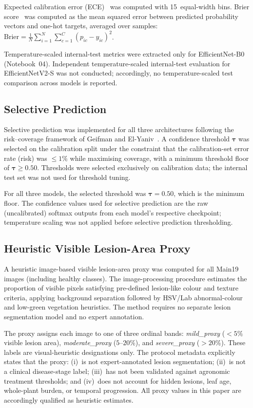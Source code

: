 \documentclass[conference]{IEEEtran}
\begin{document}
Expected calibration error (ECE)~\cite{naeini2015obtaining} was
computed with 15~equal-width bins. Brier score~\cite{brier1950verification}
was computed as the mean squared error between predicted probability
vectors and one-hot targets, averaged over samples:
$\text{Brier} = \frac{1}{N}\sum_{i=1}^{N}\sum_{c=1}^{C}(p_{ic} - y_{ic})^2$.

Temperature-scaled internal-test metrics were extracted only for
EfficientNet-B0 (Notebook~04). Independent temperature-scaled
internal-test evaluation for EfficientNetV2-S was not conducted;
accordingly, no temperature-scaled test comparison across models is
reported.

\subsection{Selective Prediction}

Selective prediction was implemented for all three architectures
following the risk--coverage framework of Geifman and
El-Yaniv~\cite{geifman2017selective}. A confidence threshold
$\bm{\tau}$ was selected on the calibration split under the constraint
that the calibration-set error rate (risk) was $\leq 1\%$ while
maximising coverage, with a minimum threshold floor of $\bm{\tau}
\geq 0.50$. Thresholds were selected exclusively on calibration data;
the internal test set was not used for threshold tuning.

For all three models, the selected threshold was
$\bm{\tau}\!=\!0.50$, which is the minimum floor. The confidence
values used for selective prediction are the raw (uncalibrated)
softmax outputs from each model's respective checkpoint; temperature
scaling was not applied before selective prediction thresholding.

\subsection{Heuristic Visible Lesion-Area Proxy}

A heuristic image-based visible lesion-area proxy was computed for all
Main19 images (including healthy classes). The image-processing
procedure estimates the proportion of visible pixels satisfying
pre-defined lesion-like colour and texture criteria, applying
background separation followed by HSV/Lab abnormal-colour and
low-green vegetation heuristics. The method requires no separate
lesion segmentation model and no expert annotation.

The proxy assigns each image to one of three ordinal bands:
\textit{mild\_proxy} ($<5\%$ visible lesion area),
\textit{moderate\_proxy} ($5$--$20\%$), and \textit{severe\_proxy}
($>20\%$). These labels are visual-heuristic designations only. The
protocol metadata explicitly states that the proxy: (i)~is not
expert-annotated lesion segmentation; (ii)~is not a clinical
disease-stage label; (iii)~has not been validated against agronomic
treatment thresholds; and (iv)~does not account for hidden lesions,
leaf age, whole-plant burden, or temporal progression. All proxy
values in this paper are accordingly qualified as heuristic estimates.
\end{document}
